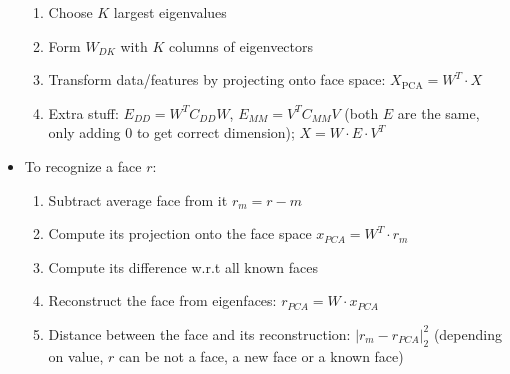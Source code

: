 \documentclass[a4paper]{article}
\begin{document}
\begin{itemize}
\begin{enumerate}
          \item Choose $K$ largest eigenvalues
          \item Form $W_{DK}$ with $K$ columns of eigenvectors
          \item Transform data/features by projecting onto face space: $X_\text{PCA}=W^T\cdot X$
          \item Extra stuff: $E_{DD}=W^TC_{DD}W$, $E_{MM}=V^TC_{MM}V$ (both $E$ are the same, only adding 0 to get correct dimension); $X=W\cdot E\cdot V^T$
        \end{enumerate}
        \item To recognize a face $r$:
        \begin{enumerate}
          \item Subtract average face from it $r_m=r-m$
          \item Compute its projection onto the face space $x_{PCA} = W^T\cdot r_m$
          \item Compute its difference w.r.t all known faces
          \item Reconstruct the face from eigenfaces: $r_{PCA}=W\cdot x_{PCA}$
          \item Distance between the face and its reconstruction: $|r_m-r_{PCA}|_2^2$ (depending on value, $r$ can be not a face, a new face or a known face)
        \end{enumerate}
      \end{itemize}
\end{document}
